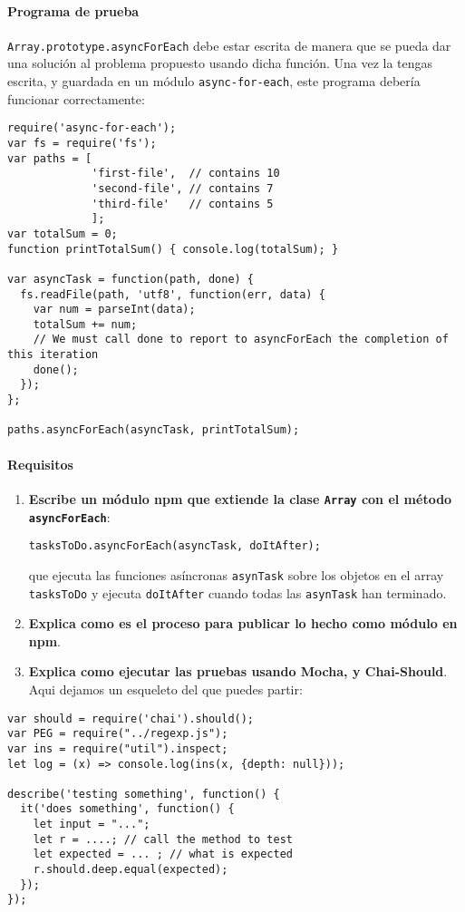\paragraph{Programa de prueba}\label{programa-de-prueba}

\texttt{Array.prototype.asyncForEach} debe estar escrita de manera que
se pueda dar una solución al problema propuesto usando dicha función.
Una vez la tengas escrita, y guardada en un módulo
\texttt{async-for-each}, este programa debería funcionar correctamente:

\begin{verbatim}
require('async-for-each');
var fs = require('fs');
var paths = [
             'first-file',  // contains 10
             'second-file', // contains 7
             'third-file'   // contains 5
             ];
var totalSum = 0;
function printTotalSum() { console.log(totalSum); }

var asyncTask = function(path, done) {
  fs.readFile(path, 'utf8', function(err, data) {
    var num = parseInt(data);
    totalSum += num;
    // We must call done to report to asyncForEach the completion of this iteration
    done();
  });
};

paths.asyncForEach(asyncTask, printTotalSum);
\end{verbatim}

\paragraph{Requisitos}\label{requisitos}

\begin{enumerate}
\def\labelenumi{\arabic{enumi}.}
\item
  \textbf{Escribe un módulo npm que extiende la clase \texttt{Array} con
  el método \texttt{asyncForEach}}:

\begin{verbatim}
tasksToDo.asyncForEach(asyncTask, doItAfter);
\end{verbatim}

  que ejecuta las funciones asíncronas \texttt{asynTask} sobre los
  objetos en el array \texttt{tasksToDo} y ejecuta \texttt{doItAfter}
  cuando todas las \texttt{asynTask} han terminado.
\item
  \textbf{Explica como es el proceso para publicar lo hecho como módulo
  en npm}.
\item
  \textbf{Explica como ejecutar las pruebas usando Mocha, y
  Chai-Should}. Aqui dejamos un esqueleto del que puedes partir:
\end{enumerate}

\begin{verbatim}
var should = require('chai').should();
var PEG = require("../regexp.js");
var ins = require("util").inspect;
let log = (x) => console.log(ins(x, {depth: null}));

describe('testing something', function() {
  it('does something', function() {
    let input = "..."; 
    let r = ....; // call the method to test
    let expected = ... ; // what is expected
    r.should.deep.equal(expected);
  });
});
\end{verbatim}
